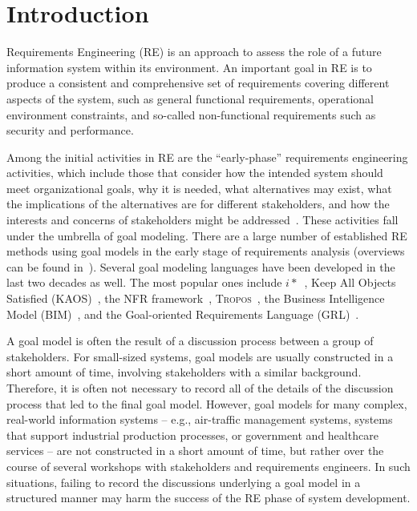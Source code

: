 \section{Introduction}
\label{sect:introduction}

Requirements Engineering (RE) is an approach to assess the role of a future information system within its environment. An important goal in RE is to produce a consistent and comprehensive set of requirements covering different aspects of the system, such as general functional requirements, operational environment constraints, and so-called non-functional requirements such as security and performance. 

Among the initial activities in RE are the ``early-phase'' requirements engineering activities, which include those that consider how the intended system should meet organizational goals, why it is needed, what alternatives may exist, what the implications of the alternatives are for different stakeholders, and how the interests and concerns of stakeholders might be addressed~\cite{yu1997towards}. These activities fall under the umbrella of goal modeling. There are a large number of established RE methods using goal models in the early stage of requirements analysis (overviews can be found in~\cite{kavakliL05,van2001goal}). Several goal modeling languages have been developed in the last two decades as well. The most popular ones include $i*$~\cite{yu1997towards}, Keep All Objects Satisfied (KAOS)~\cite{van2008requirements}, the NFR framework~\cite{chung2012non}, \textsc{Tropos}~\cite{giorgini2005goal}, the Business Intelligence Model (BIM)~\cite{horkoff2014strategic}, and the Goal-oriented Requirements Language (GRL)~\cite{Amyot:2010:EGM:1841349.1841356}.

A goal model is often the result of a discussion process between a group of stakeholders. For small-sized systems, goal models are usually constructed in a short amount of time, involving stakeholders with a similar background. Therefore, it is often not necessary to record all of the details of the discussion process that led to the final goal model. However, goal models for many complex, real-world information systems -- e.g., air-traffic management systems, systems that support industrial production processes, or government and healthcare services -- are not constructed in a short amount of time, but rather over the course of several workshops with stakeholders and requirements engineers. In such situations, failing to record the discussions underlying a goal model in a structured manner may harm the success of the RE phase of system development. 

